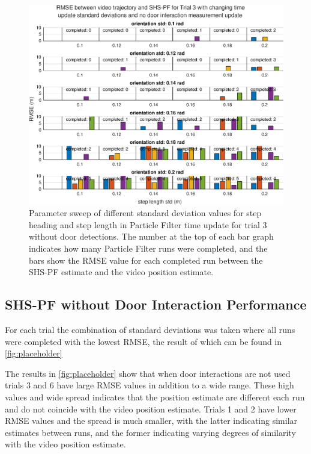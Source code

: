 \begin{figure}[H]
	\centering
	\includegraphics[width=0.8\linewidth]{"images/20201202_1344_orientation_std:_0_2_rad"}
	\setlength{\belowcaptionskip}{-15pt}
	\caption{Parameter sweep of different standard deviation values for step heading and step length in Particle Filter time update for trial 3 without door detections. The number at the top of each bar graph indicates how many Particle Filter runs were completed, and the bars show the RMSE value for each completed run between the SHS-PF estimate and the video position estimate. }
	\label{fig:rmsebetweenvideotrajectoryandshs-pffortrialnodetections31}
\end{figure}

\subsection{SHS-PF without Door Interaction Performance}

For each trial the combination of standard deviations was taken where all runs were completed with the lowest RMSE, the result of which can be found in \cref{fig:placeholder}

The results in \cref{fig:placeholder} show that when door interactions are not used trials 3 and 6 have large RMSE values in addition to a wide range. These high values and wide spread indicates that the position estimate are different each run and do not coincide with the video position estimate. Trials 1 and 2 have lower RMSE values and the spread is much smaller, with the latter indicating similar estimates between runs, and the former indicating varying degrees of similarity with the video position estimate.\par 

